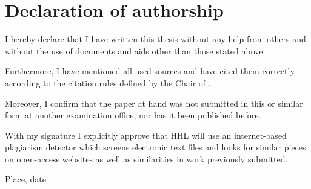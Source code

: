 
\chapter*{Declaration of authorship}

I hereby declare that I have written this thesis without any help from others and without the use of documents and aids other than those stated above.

Furthermore, I have mentioned all used sources and have cited them correctly according to the citation rules defined by the Chair of \dcchair.

Moreover, I confirm that the paper at hand was not submitted in this or similar form at another examination office, nor has it been published before.

With my signature I explicitly approve that HHL will use an internet-based plagiarism detector which screens electronic text files and looks for similar pieces on open-access websites as well as similarities in work previously submitted.

Place, date